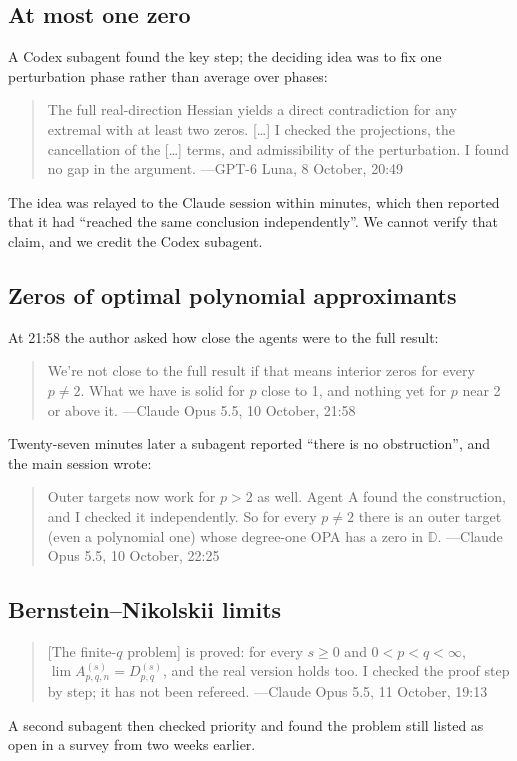 \documentclass[11pt]{amsart}
\begin{document}
\subsection*{At most one zero}
A Codex subagent found the key step; the deciding idea was to fix one
perturbation phase rather than average over phases:
\begin{quote}
  The full real-direction Hessian yields a direct contradiction for any extremal with at least two zeros. [\dots] I checked the projections, the cancellation of the [\dots] terms, and admissibility of the perturbation. I found no gap in the argument.
  \hfill---GPT-6 Luna, 8 October, 20:49
\end{quote}
The idea was relayed to the Claude session within minutes, which then reported
that it had ``reached the same conclusion independently''. We cannot verify
that claim, and we credit the Codex subagent.

\subsection*{Zeros of optimal polynomial approximants}
At 21:58 the author asked how close the agents were to the full result:
\begin{quote}
  We're not close to the full result if that means interior zeros for every $p\neq2$. What we have is solid for $p$ close to 1, and nothing yet for $p$ near 2 or above it.
  \hfill---Claude Opus 5.5, 10 October, 21:58
\end{quote}
Twenty-seven minutes later a subagent reported ``there is no obstruction'', and
the main session wrote:
\begin{quote}
  Outer targets now work for $p>2$ as well. Agent A found the construction, and I checked it independently. So for every $p\neq2$ there is an outer target (even a polynomial one) whose degree-one OPA has a zero in $\mathbb D$.
  \hfill---Claude Opus 5.5, 10 October, 22:25
\end{quote}

\subsection*{Bernstein--Nikolskii limits}
\begin{quote}
  [The finite-$q$ problem] is proved: for every $s\geq0$ and $0<p<q<\infty$, $\lim A^{(s)}_{p,q,n}=D^{(s)}_{p,q}$, and the real version holds too. I checked the proof step by step; it has not been refereed.
  \hfill---Claude Opus 5.5, 11 October, 19:13
\end{quote}
A second subagent then checked priority and found the problem still listed as
open in a survey from two weeks earlier.
\end{document}
